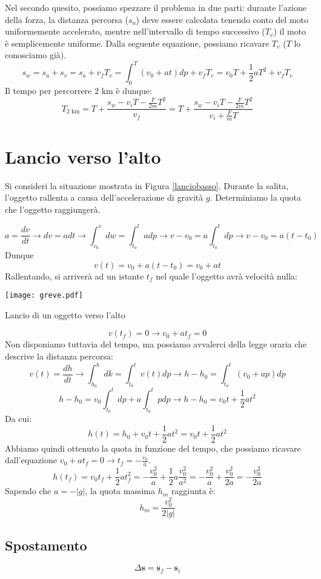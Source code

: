 Nel secondo quesito, possiamo spezzare il problema in due parti: durante
l'azione della forza, la distanza percorsa ($s_a$) deve essere calcolata tenendo
conto del moto uniformemente accelerato, mentre nell'intervallo di tempo
successivo ($T_v$) il moto è semplicemente uniforme. Dalla seguente equazione,
possiamo ricavare $T_v$ ($T$ lo conosciamo già).
\[ s_w = s_a + s_v = s_a + v_fT_v = \int_{0}^{T}(v_0 + at)dp + v_fT_v = v_0T + \frac{1}{2}aT^2 + v_fT_v \]
Il tempo per percorrere $2\text{ km}$ è dunque:
\[ T_{2\text{ km}} = T + \frac{s_w - v_iT - \frac{F}{2m}T^2}{v_f} = T + \frac{s_w - v_iT - \frac{F}{2m}T^2}{v_i + \frac{F}{m}T} \]

\section{Lancio verso l'alto}
Si consideri la situazione mostrata in Figura \ref{lanciobasso}.
Durante la salita, l'oggetto rallenta a causa dell'accelerazione di gravità $g$.
Determiniamo la quota che l'oggetto raggiungerà.

\[ a = \frac{dv}{dt} \to dv = adt \to \int_{v_0}^{v}dw = \int_{t_0}^{t}adp \to v - v_0 = a\int_{t_0}^{t}dp \to v - v_0 = a(t - t_0) \]
Dunque
\[ v(t) = v_0 + a(t - t_0) = v_0 + at \]
Rallentando, si arriverà ad un istante $t_f$ nel quale l'oggetto avrà velocità
nulla:
\begin{marginfigure}
    \centering
    \texttt{[image: greve.pdf]}
    \caption{Lancio di un oggetto verso l'alto}
    \label{lanciobasso}
\end{marginfigure}
\[ v(t_f) = 0 \to v_0 + at_f = 0 \]
Non disponiamo tuttavia del tempo, ma possiamo avvalerci della legge oraria
che descrive la distanza percorsa:
\[ v(t) = \frac{dh}{dt} \to \int_{h_0}^{h}dk = \int_{t_0}^{t}v(t)dp \to h - h_0 = \int_{t_0}^{t}(v_0 + ap)dp \]
\[ h - h_0 = v_0\int_{t_0}^{t}dp + a\int_{t_0}^{t}pdp \to h - h_0 = v_0t + \frac12 at^2 \]
Da cui:
\[ h(t) = h_0 + v_0t + \frac12 at^2 = v_0t + \frac12 at^2 \]
Abbiamo quindi ottenuto la quota in funzione del tempo, che possiamo ricavare
dall'equazione $v_0 + at_f = 0 \to t_f = -\frac{v_0}{a}$.
\[ h(t_f) = v_0t_f + \frac12 at_{f}^2 =  -\frac{v_0^2}{a} + \frac{1}{2}a\frac{v_0^2}{a^2} = -\frac{v_0^2}{a} + \frac{v_0^2}{2a} = -\frac{v_0^2}{2a} \]
Sapendo che $a = -|g|$, la quota massima $h_m$ raggiunta è:
\[ h_m = \frac{v_0^2}{2|g|} \]


\subsection*{Spostamento}
\[ \Delta\mathbf{s} = \mathbf{s}_f - \mathbf{s}_i \]


